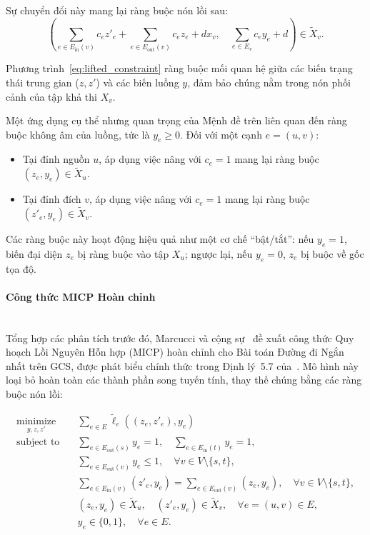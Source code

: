 Sự chuyển đổi này mang lại ràng buộc nón lồi sau:
\begin{equation}
    \left( \sum_{e \in E_{\text{in}}(v)} c_e z'_e + \sum_{e \in E_{\text{out}}(v)} c_e z_e + d x_v, \quad \sum_{e \in E_v} c_e y_e + d \right) \in \tilde{X}_v. \label{eq:lifted_constraint}
\end{equation}

Phương trình~\eqref{eq:lifted_constraint} ràng buộc mối quan hệ giữa các biến trạng thái trung gian ($z, z'$) và các biến luồng $y$, đảm bảo chúng nằm trong nón phối cảnh của tập khả thi $X_v$.

Một ứng dụng cụ thể nhưng quan trọng của Mệnh đề trên liên quan đến ràng buộc không âm của luồng, tức là $y_e \ge 0$. Đối với một cạnh $e=(u, v)$:
\begin{itemize}
    \item Tại đỉnh nguồn $u$, áp dụng việc nâng với $c_e=1$ mang lại ràng buộc $(z_e, y_e) \in \tilde{X}_u$.
    \item Tại đỉnh đích $v$, áp dụng việc nâng với $c_e=1$ mang lại ràng buộc $(z'_e, y_e) \in \tilde{X}_v$.
\end{itemize}
Các ràng buộc này hoạt động hiệu quả như một cơ chế ``bật/tắt'': nếu $y_e=1$, biến đại diện $z_e$ bị ràng buộc vào tập $X_u$; ngược lại, nếu $y_e=0$, $z_e$ bị buộc về gốc tọa độ.

\paragraph{Công thức MICP Hoàn chỉnh}\mbox{}\\

Tổng hợp các phân tích trước đó, Marcucci và cộng sự~\cite{MarcucciEtAl2023GCS} đề xuất công thức Quy hoạch Lồi Nguyên Hỗn hợp (MICP) hoàn chỉnh cho Bài toán Đường đi Ngắn nhất trên GCS, được phát biểu chính thức trong Định lý~5.7 của~\cite{MarcucciEtAl2023GCS}. Mô hình này loại bỏ hoàn toàn các thành phần song tuyến tính, thay thế chúng bằng các ràng buộc nón lồi:

\begin{subequations}\label{eq:micp_formulation}
\begin{align}
  \underset{y, z, z'}{\text{minimize}} \quad & \sum_{e \in E} \tilde{\ell}_e((z_e, z'_e), y_e) \label{eq:micp_obj} \\
  \text{subject to} \quad & \sum_{e \in E_{\text{out}}(s)} y_e = 1, \quad \sum_{e \in E_{\text{in}}(t)} y_e = 1, \label{eq:micp_flow_st} \\
  & \sum_{e \in E_{\text{out}}(v)} y_e \le 1, \quad \forall v \in V \setminus \{s, t\}, \label{eq:micp_flow_int} \\
  & \sum_{e \in E_{\text{in}}(v)} (z'_e, y_e) = \sum_{e \in E_{\text{out}}(v)} (z_e, y_e), \quad \forall v \in V \setminus \{s, t\}, \label{eq:micp_spatial} \\
  & (z_e, y_e) \in \tilde{X}_u, \quad (z'_e, y_e) \in \tilde{X}_v, \quad \forall e = (u, v) \in E, \label{eq:micp_cone} \\
  & y_e \in \{0, 1\}, \quad \forall e \in E. \label{eq:micp_binary}
\end{align}
\end{subequations}

